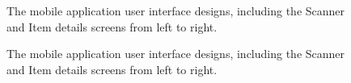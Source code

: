 \documentclass[a4paper,11pt]{report}
\begin{document}
\begin{appendix}
\begin{figure}[H]
        \caption{The mobile application user interface designs, including the Scanner and Item details screens from left to right.}
        \label{fig:mobileUIpt2}
    \end{figure}
    \begin{figure}[H]
        \centering
        \caption{The mobile application user interface designs, including the Scanner and Item details screens from left to right.}
        \label{fig:mobileUIpt2}
    \end{figure}
    \begin{figure}[H]
        \centering

\end{figure}
\end{appendix}
\end{document}
